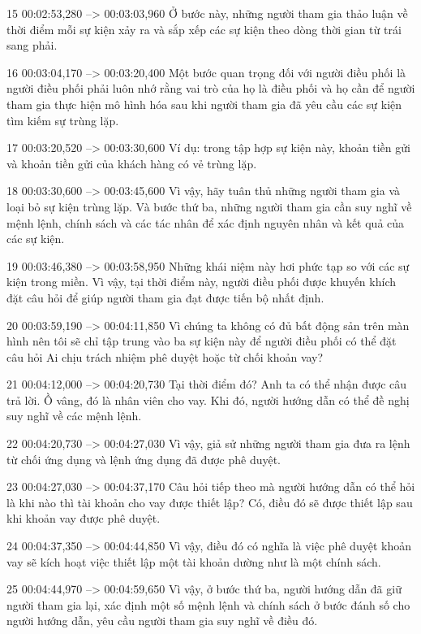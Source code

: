 15
00:02:53,280 --> 00:03:03,960
Ở bước này, những người tham gia thảo luận về thời điểm mỗi sự kiện xảy ra và sắp xếp các sự kiện theo dòng thời gian từ trái sang phải.

16
00:03:04,170 --> 00:03:20,400
Một bước quan trọng đối với người điều phối là người điều phối phải luôn nhớ rằng vai trò của họ là điều phối và họ cần để người tham gia thực hiện mô hình hóa sau khi người tham gia đã yêu cầu các sự kiện tìm kiếm sự trùng lặp.

17
00:03:20,520 --> 00:03:30,600
Ví dụ: trong tập hợp sự kiện này, khoản tiền gửi và khoản tiền gửi của khách hàng có vẻ trùng lặp.

18
00:03:30,600 --> 00:03:45,600
Vì vậy, hãy tuân thủ những người tham gia và loại bỏ sự kiện trùng lặp.  Và bước thứ ba, những người tham gia cần suy nghĩ về mệnh lệnh, chính sách và các tác nhân để xác định nguyên nhân và kết quả của các sự kiện.

19
00:03:46,380 --> 00:03:58,950
Những khái niệm này hơi phức tạp so với các sự kiện trong miền.  Vì vậy, tại thời điểm này, người điều phối được khuyến khích đặt câu hỏi để giúp người tham gia đạt được tiến bộ nhất định.

20
00:03:59,190 --> 00:04:11,850
Vì chúng ta không có đủ bất động sản trên màn hình nên tôi sẽ chỉ tập trung vào ba sự kiện này để người điều phối có thể đặt câu hỏi Ai chịu trách nhiệm phê duyệt hoặc từ chối khoản vay?

21
00:04:12,000 --> 00:04:20,730
Tại thời điểm đó?  Anh ta có thể nhận được câu trả lời.  Ồ vâng, đó là nhân viên cho vay.  Khi đó, người hướng dẫn có thể đề nghị suy nghĩ về các mệnh lệnh.

22
00:04:20,730 --> 00:04:27,030
Vì vậy, giả sử những người tham gia đưa ra lệnh từ chối ứng dụng và lệnh ứng dụng đã được phê duyệt.

23
00:04:27,030 --> 00:04:37,170
Câu hỏi tiếp theo mà người hướng dẫn có thể hỏi là khi nào thì tài khoản cho vay được thiết lập?  Có, điều đó sẽ được thiết lập sau khi khoản vay được phê duyệt.

24
00:04:37,350 --> 00:04:44,850
Vì vậy, điều đó có nghĩa là việc phê duyệt khoản vay sẽ kích hoạt việc thiết lập một tài khoản dường như là một chính sách.

25
00:04:44,970 --> 00:04:59,650
Vì vậy, ở bước thứ ba, người hướng dẫn đã giữ người tham gia lại, xác định một số mệnh lệnh và chính sách ở bước đánh số cho người hướng dẫn, yêu cầu người tham gia suy nghĩ về điều đó.

